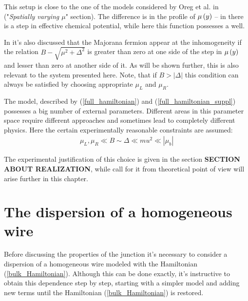   This setup is close to the one of the models  considered by Oreg et al. in \cite{Oreg_2010} ("\textit{Spatially varying $ \mu $}" section). The difference is in the profile of $ \mu\left(y\right) $ -- in \cite{Oreg_2010}  there is a step in effective chemical potential, while here this function possesses a well.  
  
 In \cite{Oreg_2010} it's also discussed that the Majorana fermion appear at the inhomogeneity if the relation $ B-\sqrt{\mu^2+\Delta^2} $ is greater than zero at one side of the step in $ \mu\left(y\right) $ and lesser than zero at another side of it. As will be shown further, this is also relevant to the  system presented here. Note, that if $ B > \left|\Delta\right| $ this condition can always be satisfied by choosing appropriate $ \mu_L $ and $ \mu_R $. 
 
 The model, described by (\ref{full_hamiltonian}) and (\ref{full_hamiltonian_suppl}) possesses a big number of external parameters. Different areas in this parameter space require different approaches and sometimes lead to completely different physics. Here the certain experimentally reasonable constraints are assumed:
  \begin{gather}
 \label{constraints}
 	\mu_L,\mu_R \ll B \sim \Delta \ll mu^2\ll \left|\mu_b\right|
 \end{gather} 

  The experimental justification of this choice is given in the section \textbf{SECTION ABOUT REALIZATION}, while call for it from theoretical point of view will arise further in this chapter.
  


\section{The dispersion of a homogeneous wire}

Before discussing the properties of the junction it's necessary to consider a dispersion of a homogeneous wire modeled with the Hamiltonian (\ref{bulk_Hamiltonian}). Although this can be done exactly, it's instructive to obtain this dependence step by step, starting with a simpler model and adding new terms until the Hamiltonian (\ref{bulk_Hamiltonian}) is restored.

